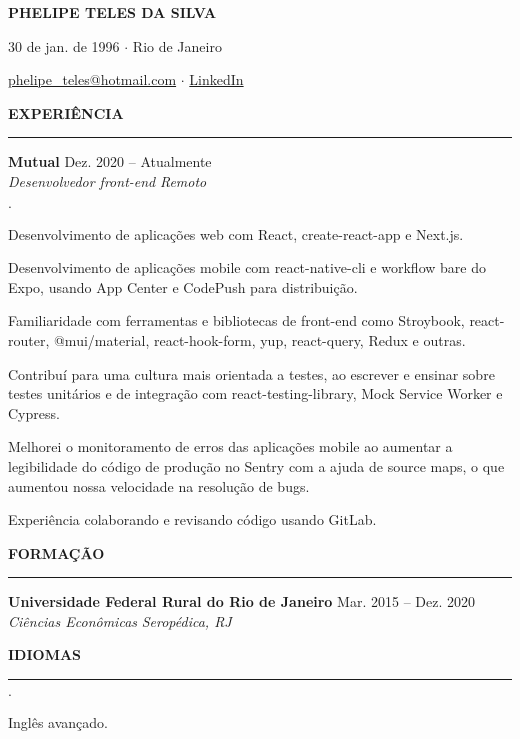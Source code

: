 \documentclass[12pt,letterpaper]{article}
\newenvironment{tightlist}
  {\begin{list}
    {$\cdot$}
    {
      \setlength{\leftmargin}{0em}
      \setlength{\itemsep}{-\smallskipamount}
    }
  }
{\end{list}}
\begin{document}
\pagestyle{empty}

\centerline{\huge\bf PHELIPE TELES DA SILVA}
\medskip

\centerline{30 de jan. de 1996 $\cdot$ Rio de Janeiro}
\smallskip

\centerline{
  \href{mailto:phelipe_teles@hotmail.com}{phelipe\_teles@hotmail.com}
  $\cdot$
  \href{https://linkedin.com/in/phelipeteles}{LinkedIn}
}
\smallskip

\medskip \textbf{EXPERIÊNCIA} \medskip
\hrule

\textbf{Mutual} \hfill Dez. 2020 -- Atualmente \\
\emph{Desenvolvedor front-end} \hfill \emph{Remoto} {\parfillskip=0pt\par}

\begin{tightlist}
  \item Desenvolvimento de aplicações web com React, create-react-app e Next.js.
  \item Desenvolvimento de aplicações mobile com react-native-cli e workflow bare do
    Expo, usando App Center e CodePush para distribuição.
  \item Familiaridade com ferramentas e bibliotecas de front-end como
    Stroybook, react-router, @mui/material, react-hook-form, yup,
    react-query, Redux e outras.
  \item Contribuí para uma cultura mais orientada a testes, ao escrever e
    ensinar sobre testes unitários e de integração com
    react-testing-library, Mock Service Worker e Cypress.
  \item Melhorei o monitoramento de erros das aplicações mobile ao aumentar a
    legibilidade do código de produção no Sentry com a ajuda de source
    maps, o que aumentou nossa velocidade na resolução de bugs.
  \item Experiência colaborando e revisando código usando GitLab.
\end{tightlist}

\medskip \textbf{FORMAÇÃO} \medskip
\hrule

\textbf{Universidade Federal Rural do Rio de Janeiro} \hfill {Mar. 2015 -- Dez. 2020} \\
\emph{Ciências Econômicas} \hfill \emph{Seropédica, RJ} {\parfillskip=0pt\par}

\medskip \textbf{IDIOMAS} \medskip
\hrule

\begin{tightlist}
  \item Inglês avançado.
\end{tightlist}
\end{document}
